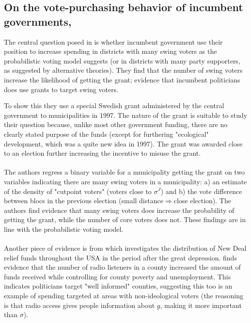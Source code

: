 \subsection{On the vote-purchasing behavior of incumbent governments, \cite{dahlberg_vote-purchasing_2002}}
The central question posed in \cite{dahlberg_vote-purchasing_2002} is whether incumbent government use their position to increase spending in districts with many swing voters as the probabilistic voting model suggests (or in districts with many party supporters, as suggested by alternative theories). They find that the number of swing voters increase the likelihood of getting the grant; evidence that incumbent politicians does use grants to target swing voters. 

To show this they use a special Swedish grant administered by the central government to municipalities in 1997. The nature of the grant is suitable to study their question because, unlike most other government funding, there are no clearly stated purpose of the funds (except for furthering "ecological" development, which was a quite new idea in 1997). The grant was awarded close to an election further increasing the incentive to misuse the grant. 
\\ \\
The authors regress a binary variable for a municipality getting the grant on two variables indicating there are many swing voters in a municipality: a) an estimate of the density of "cutpoint voters" (voters close to $\sigma^J$) and b) the vote difference between blocs in the previous election (small distance$\Rightarrow$close election). 
The authors find evidence that many swing voters does increase the probability of getting the grant, while the number of core voters does not. These findings are in line with the probabilistic voting model.
\\ \\ 
Another piece of evidence is from \cite{stromberg_radios_2004} which investigates the distribution of New Deal relief funds throughout the USA in the period after the great depression. \citeauthor{stromberg_radios_2004} finds evidence that the number of radio listeners in a county increased the amount of funds received while controlling for county poverty and unemployment. This indicates politicians target "well informed" counties, suggesting this too is an example of spending targeted at areas with non-ideological voters (the reasoning is that radio access gives people information about $g$, making it more important than $\sigma$).  

